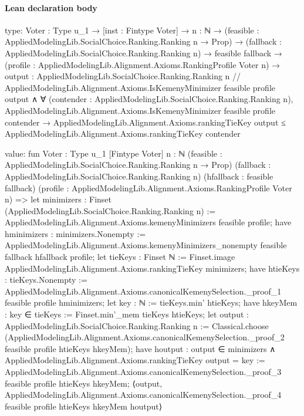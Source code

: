 \documentclass[10pt]{article}
\begin{document}
\paragraph{Lean declaration body}
\begin{ReviewVerbatim}
type:
{Voter : Type u_1} →
  [inst : Fintype Voter] →
    {n : ℕ} →
      (feasible : AppliedModelingLib.SocialChoice.Ranking.Ranking n → Prop) →
        (fallback : AppliedModelingLib.SocialChoice.Ranking.Ranking n) →
          feasible fallback →
            (profile : AppliedModelingLib.Alignment.Axioms.RankingProfile Voter n) →
              { output : AppliedModelingLib.SocialChoice.Ranking.Ranking n //
                AppliedModelingLib.Alignment.Axioms.IsKemenyMinimizer feasible profile output ∧
                  ∀ (contender : AppliedModelingLib.SocialChoice.Ranking.Ranking n),
                    AppliedModelingLib.Alignment.Axioms.IsKemenyMinimizer feasible profile contender →
                      AppliedModelingLib.Alignment.Axioms.rankingTieKey output ≤
                        AppliedModelingLib.Alignment.Axioms.rankingTieKey contender }

value:
fun {Voter : Type u_1} [Fintype Voter] {n : ℕ} (feasible : AppliedModelingLib.SocialChoice.Ranking.Ranking n → Prop)
    (fallback : AppliedModelingLib.SocialChoice.Ranking.Ranking n) (hfallback : feasible fallback)
    (profile : AppliedModelingLib.Alignment.Axioms.RankingProfile Voter n) =>
  let minimizers : Finset (AppliedModelingLib.SocialChoice.Ranking.Ranking n) :=
    AppliedModelingLib.Alignment.Axioms.kemenyMinimizers feasible profile;
  have hminimizers : minimizers.Nonempty :=
    AppliedModelingLib.Alignment.Axioms.kemenyMinimizers_nonempty feasible fallback hfallback profile;
  let tieKeys : Finset ℕ := Finset.image AppliedModelingLib.Alignment.Axioms.rankingTieKey minimizers;
  have htieKeys : tieKeys.Nonempty :=
    AppliedModelingLib.Alignment.Axioms.canonicalKemenySelection._proof_1 feasible profile hminimizers;
  let key : ℕ := tieKeys.min' htieKeys;
  have hkeyMem : key ∈ tieKeys := Finset.min'_mem tieKeys htieKeys;
  let output : AppliedModelingLib.SocialChoice.Ranking.Ranking n :=
    Classical.choose
      (AppliedModelingLib.Alignment.Axioms.canonicalKemenySelection._proof_2 feasible profile htieKeys hkeyMem);
  have houtput : output ∈ minimizers ∧ AppliedModelingLib.Alignment.Axioms.rankingTieKey output = key :=
    AppliedModelingLib.Alignment.Axioms.canonicalKemenySelection._proof_3 feasible profile htieKeys hkeyMem;
  ⟨output,
    AppliedModelingLib.Alignment.Axioms.canonicalKemenySelection._proof_4 feasible profile htieKeys hkeyMem houtput⟩
\end{ReviewVerbatim}
\end{document}
